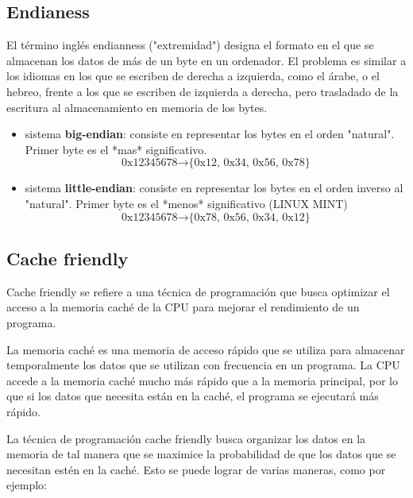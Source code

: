 \documentclass[../main.tex]{subfiles}
\begin{document}
    \subsection{Endianess}
        El término inglés endianness ("extremidad") designa el formato en el que se almacenan los datos de más de un byte en un ordenador. El problema es similar a los idiomas en los que se escriben de derecha a izquierda, como el árabe, o el hebreo, frente a los que se escriben de izquierda a derecha, pero trasladado de la escritura al almacenamiento en memoria de los bytes.


        \begin{itemize}
            \item sistema \textbf{big-endian}: consiste en representar los bytes en el orden "natural". Primer byte es el *mas* significativo.
                \begin{equation*}
                    \text{0x12345678} \rightarrow \text{\{0x12, 0x34, 0x56, 0x78\}}                        
                \end{equation*}
            \item sistema \textbf{little-endian}: consiste en representar los bytes en el orden inverso al "natural". Primer byte es el *menos* significativo (LINUX MINT)
                \begin{equation*}
                    \text{0x12345678} \rightarrow \text{\{0x78, 0x56, 0x34, 0x12\}}                        
                \end{equation*}
        \end{itemize}

    \subsection{Cache friendly}
        Cache friendly se refiere a una técnica de programación que busca optimizar el acceso a la memoria caché de la CPU para mejorar el rendimiento de un programa.

        La memoria caché es una memoria de acceso rápido que se utiliza para almacenar temporalmente los datos que se utilizan con frecuencia en un programa. La CPU accede a la memoria caché mucho más rápido que a la memoria principal, por lo que si los datos que necesita están en la caché, el programa se ejecutará más rápido.
        
        La técnica de programación cache friendly busca organizar los datos en la memoria de tal manera que se maximice la probabilidad de que los datos que se necesitan estén en la caché. Esto se puede lograr de varias maneras, como por ejemplo:
        
\end{document}
